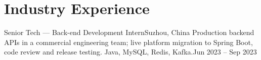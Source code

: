 \section{Industry Experience}
  \resumeSubHeadingListStart
    \resumeSubheading
      {Senior Tech --- Back-end Development Intern}{Suzhou, China}
      {Production backend APIs in a commercial engineering team; live platform migration to Spring Boot, code review and release testing. Java, MySQL, Redis, Kafka.}{Jun 2023 -- Sep 2023}
  \resumeSubHeadingListEnd
